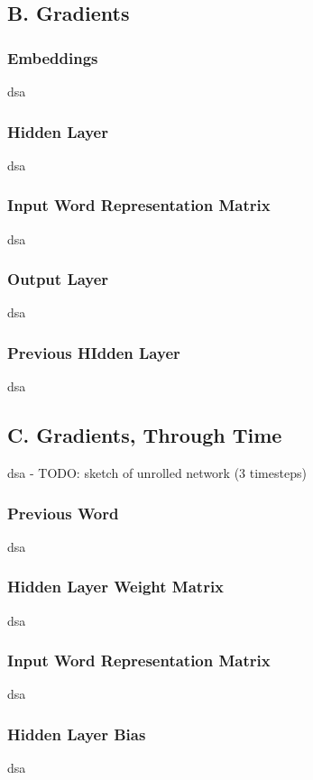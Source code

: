 \documentclass{article}
\begin{document}
\subsection*{B. Gradients}
\subsubsection*{Embeddings}
dsa

\subsubsection*{Hidden Layer}
dsa

\subsubsection*{Input Word Representation Matrix}
dsa

\subsubsection*{Output Layer}
dsa

\subsubsection*{Previous HIdden Layer}
dsa

\subsection*{C. Gradients, Through Time}
dsa - TODO: sketch of unrolled network (3 timesteps)

\subsubsection*{Previous Word	}
dsa

\subsubsection*{Hidden Layer Weight Matrix}
dsa

\subsubsection*{Input Word Representation Matrix}
dsa

\subsubsection*{Hidden Layer Bias}
dsa
\end{document}

